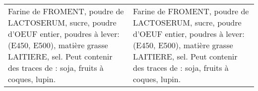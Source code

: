 \begin{tabular}{p{7cm}p{7cm}}
                                                                                                                                                                                                                                                                              Farine de FROMENT, poudre de LACTOSERUM, sucre, poudre d'OEUF entier, poudres à lever: (E450, E500), matière grasse LAITIERE, sel. \newline Peut contenir des traces de : soja, fruits à coques, lupin. &                                                                                                                                                                                                                                                                                                                                                                                                                                                                                                                                                                                                                                                                                                                                                                                                                                                                                                                                                                                                                                                                                                                                                                                                                                      Farine de FROMENT, poudre de LACTOSERUM, sucre, poudre d'OEUF entier, poudres à lever: (E450,  \newline E500), matière grasse LAITIERE, sel. \newline Peut contenir des traces de : soja, fruits à coques, lupin. \\

\end{tabular}
